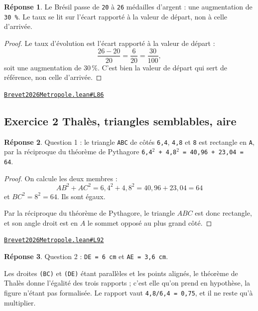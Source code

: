 \documentclass[11pt,a4paper]{article}
\theoremstyle{definition}
\theoremstyle{plain}
\theoremstyle{definition}
\newtheorem*{reponse}{Réponse}
\newcommand{\source}[2]{\par\smallskip\noindent\hfill{\footnotesize\href{#1}{\texttt{#2}}}\par\smallskip}
\begin{document}
\begin{reponse}
Le Brésil passe de \texttt{20} à \texttt{26} médailles d'argent : une augmentation de
\texttt{30 \%}. Le taux se lit sur l'écart rapporté à la valeur de départ, non à celle
d'arrivée.
\end{reponse}
\begin{proof}
Le taux d'évolution est l'écart rapporté à la valeur de départ :
\[ \frac{26 - 20}{20} = \frac{6}{20} = \frac{30}{100} , \]
soit une augmentation de $30\,\%$. C'est bien la valeur de départ qui sert de référence,
non celle d'arrivée.
\end{proof}
\source{https://github.com/Commutator-IO/learn-lean/blob/main/exams/2026/Brevet2026Metropole.lean\#L86}{Brevet2026Metropole.lean\#L86}

\subsection{Exercice 2 \textemdash{} Thalès, triangles semblables, aire}

\begin{reponse}
Question 1 : le triangle \texttt{ABC} de côtés \texttt{6,4}, \texttt{4,8} et \texttt{8} est rectangle en
\texttt{A}, par la réciproque du théorème de Pythagore \textemdash{} \texttt{6,4\(^{2}\) + 4,8\(^{2}\) = 40,96 + 23,04 = 64}.
\end{reponse}
\begin{proof}
On calcule les deux membres :
\[ AB^2 + AC^2 = 6{,}4^2 + 4{,}8^2 = 40{,}96 + 23{,}04 = 64 \]
et $BC^2 = 8^2 = 64$. Ils sont égaux.

Par la réciproque du théorème de Pythagore, le triangle $ABC$ est donc rectangle, et son
angle droit est en $A$ \textemdash{} le sommet opposé au plus grand côté.
\end{proof}
\source{https://github.com/Commutator-IO/learn-lean/blob/main/exams/2026/Brevet2026Metropole.lean\#L92}{Brevet2026Metropole.lean\#L92}

\begin{reponse}
Question 2 : \texttt{DE = 6 cm} et \texttt{AE = 3,6 cm}.

Les droites \texttt{(BC)} et \texttt{(DE)} étant parallèles et les points alignés, le théorème
de Thalès donne l'égalité des trois rapports ; c'est elle qu'on prend en
hypothèse, la figure n'étant pas formalisée. Le rapport vaut \texttt{4,8/6,4 = 0,75}, et
il ne reste qu'à multiplier.
\end{reponse}
\end{document}
